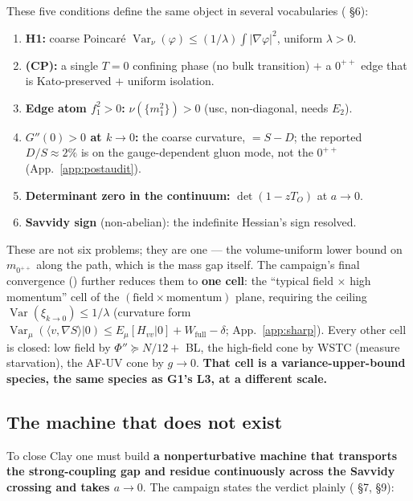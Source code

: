 These five conditions define the same object in several vocabularies
( \S6):

\begin{enumerate}
\item \textbf{H1:} coarse Poincaré $\operatorname{Var}_\nu(\varphi)\le(1/\lambda)\int|\nabla
  \varphi|^2$, uniform $\lambda>0$.
\item \textbf{(CP):} a single $T=0$ confining phase (no bulk transition) $+$ a $0^{++}$ edge that
  is Kato-preserved $+$ uniform isolation.
\item \textbf{Edge atom $f_1^2>0$:} $\nu(\{m_1^2\})>0$ (usc, non-diagonal, needs $E_2$).
\item \textbf{$G''(0)>0$ at $k\to0$:} the coarse curvature, $=S-D$; the reported $D/S\approx2\%$ is on the gauge-dependent gluon mode, not the $0^{++}$ (App.~\ref{app:postaudit}).
\item \textbf{Determinant zero in the continuum:} $\det(1-zT_O)$ at $a\to0$.
\item \textbf{Savvidy sign} (non-abelian): the indefinite Hessian's sign resolved.
\end{enumerate}

These are not six problems; they are one --- the volume-uniform lower bound on $m_{0^{++}}$ along
the path, which is the mass gap itself. The campaign's final convergence
() further reduces them to \textbf{one cell}: the ``typical field
$\times$ high momentum'' cell of the $(\text{field}\times\text{momentum})$ plane, requiring
the ceiling $\operatorname{Var}(\xi_{k\to0})\le1/\lambda$ (curvature form
$\operatorname{Var}_\mu(\langle v,\nabla S\rangle|0)\le E_\mu[H_{vv}|0]+W_{\mathrm{full}}-\delta$;
App.~\ref{app:sharp}). Every other cell is
closed: low field by $\Phi''\succeq N/12+$ BL, the high-field cone by WSTC (measure starvation),
the AF-UV cone by $g\to0$. \textbf{That cell is a variance-upper-bound species, the same species
as G1's L3, at a different scale.}

\subsection{The machine that does not exist}

To close Clay one must build \textbf{a nonperturbative machine that transports the
strong-coupling gap and residue continuously across the Savvidy crossing and takes $a\to0$}. The
campaign states the verdict plainly ( \S7,
 \S9):

